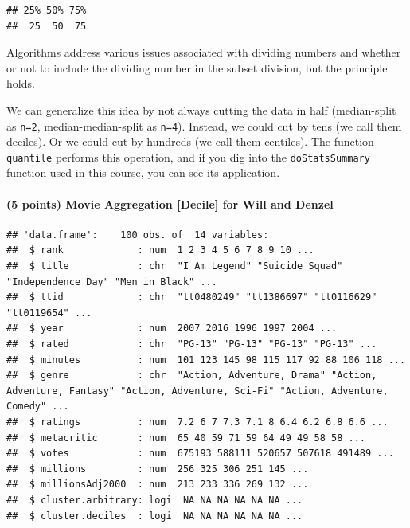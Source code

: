 \documentclass[
]{article}
\newenvironment{Shaded}{\begin{snugshade}}{\end{snugshade}}
\newcommand{\FloatTok}[1]{\textcolor[rgb]{0.00,0.00,0.81}{#1}}
\newcommand{\KeywordTok}[1]{\textcolor[rgb]{0.13,0.29,0.53}{\textbf{#1}}}
\newcommand{\NormalTok}[1]{#1}
\newcommand{\OperatorTok}[1]{\textcolor[rgb]{0.81,0.36,0.00}{\textbf{#1}}}
\newcommand{\OtherTok}[1]{\textcolor[rgb]{0.56,0.35,0.01}{#1}}
\newcommand{\StringTok}[1]{\textcolor[rgb]{0.31,0.60,0.02}{#1}}
\begin{document}
\begin{verbatim}
## 25% 50% 75% 
##  25  50  75
\end{verbatim}

Algorithms address various issues associated with dividing numbers and
whether or not to include the dividing number in the subset division,
but the principle holds.

We can generalize this idea by not always cutting the data in half
(median-split as \texttt{n=2}, median-median-split as \texttt{n=4}).
Instead, we could cut by tens (we call them deciles). Or we could cut by
hundreds (we call them centiles). The function \texttt{quantile}
performs this operation, and if you dig into the \texttt{doStatsSummary}
function used in this course, you can see its application.

\hypertarget{points-movie-aggregation-decile-for-will-and-denzel}{%
\paragraph{(5 points) Movie Aggregation {[}Decile{]} for Will and
Denzel}\label{points-movie-aggregation-decile-for-will-and-denzel}}

\begin{Shaded}
\end{Shaded}

\begin{verbatim}
## 'data.frame':    100 obs. of  14 variables:
##  $ rank             : num  1 2 3 4 5 6 7 8 9 10 ...
##  $ title            : chr  "I Am Legend" "Suicide Squad" "Independence Day" "Men in Black" ...
##  $ ttid             : chr  "tt0480249" "tt1386697" "tt0116629" "tt0119654" ...
##  $ year             : num  2007 2016 1996 1997 2004 ...
##  $ rated            : chr  "PG-13" "PG-13" "PG-13" "PG-13" ...
##  $ minutes          : num  101 123 145 98 115 117 92 88 106 118 ...
##  $ genre            : chr  "Action, Adventure, Drama" "Action, Adventure, Fantasy" "Action, Adventure, Sci-Fi" "Action, Adventure, Comedy" ...
##  $ ratings          : num  7.2 6 7 7.3 7.1 8 6.4 6.2 6.8 6.6 ...
##  $ metacritic       : num  65 40 59 71 59 64 49 49 58 58 ...
##  $ votes            : num  675193 588111 520657 507618 491489 ...
##  $ millions         : num  256 325 306 251 145 ...
##  $ millionsAdj2000  : num  213 233 336 269 132 ...
##  $ cluster.arbitrary: logi  NA NA NA NA NA NA ...
##  $ cluster.deciles  : logi  NA NA NA NA NA NA ...
\end{verbatim}
\end{document}
